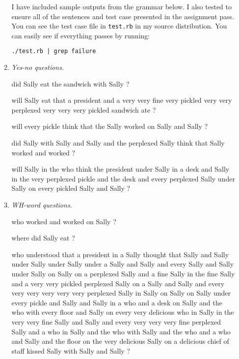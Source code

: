 \documentclass[10pt]{article}
\begin{document}
\begin{enumerate}
\begin{enumerate}

I have included sample outputs from the grammar below. I also tested to ensure all of the sentences and test case presented in the assignment pass. You can see the test case file in {\tt test.rb} in my source distribution. You can easily see if everything passes by running:

{\tt ./test.rb | grep failure}

\item {\it Yes-no questions}.

{\tt 

did Sally eat the sandwich with Sally ?

\vspace{0.2cm}

will Sally eat that a president and a very very fine very pickled very very perplexed very very very pickled sandwich ate ?

\vspace{0.2cm}

will every pickle think that the Sally worked on Sally and Sally ?

\vspace{0.2cm}

did Sally with Sally and Sally and the perplexed Sally think that Sally worked and worked ?

\vspace{0.2cm}

will Sally in the who think the president under Sally in a desk and Sally in the very perplexed pickle and the desk and every perplexed Sally under Sally on every pickled Sally and Sally ?




}

\item {\it WH-word questions.} 

{\tt

who worked and worked on Sally ?

\vspace{0.2cm}

where did Sally eat ?

\vspace{0.2cm}

who understood that a president in a Sally thought that Sally and Sally under Sally under Sally under a Sally and Sally and every Sally and Sally under Sally on Sally on a perplexed Sally and a fine Sally in the fine Sally and a very very pickled perplexed Sally on a Sally and Sally and every very very very very very perplexed Sally in Sally on Sally on Sally under every pickle and Sally and Sally in a who and a desk on Sally and the who with every floor and Sally on every very delicious who in Sally in the very very fine Sally and Sally and every very very very fine perplexed Sally and a who in Sally and the who with Sally and the who and a who and Sally and the floor on the very delicious Sally on a delicious chief of staff kissed Sally with Sally and Sally ?

}
\end{enumerate}
\end{enumerate}
\end{document}
